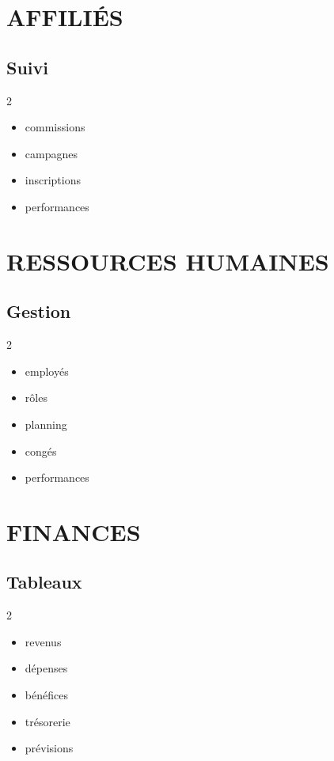 \documentclass[12pt,a4paper,oneside]{book}
\begin{document}
\chapter{AFFILIÉS}

\section{Suivi}
\begin{multicols}{2}
\begin{itemize}
\item commissions
\item campagnes
\item inscriptions
\item performances
\end{itemize}
\end{multicols}

\chapter{RESSOURCES HUMAINES}

\section{Gestion}
\begin{multicols}{2}
\begin{itemize}
\item employés
\item rôles
\item planning
\item congés
\item performances
\end{itemize}
\end{multicols}

\chapter{FINANCES}

\section{Tableaux}
\begin{multicols}{2}
\begin{itemize}
\item revenus
\item dépenses
\item bénéfices
\item trésorerie
\item prévisions
\end{itemize}
\end{multicols}
\end{document}
